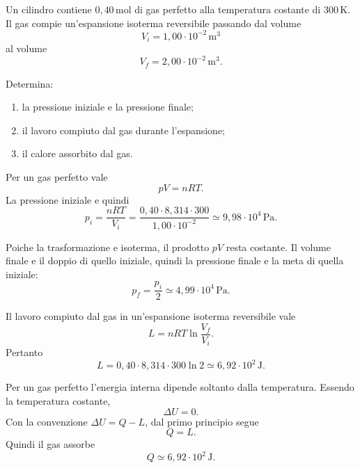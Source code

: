 
\begin{esercizio}
Un cilindro contiene \(0{,}40\,\mathrm{mol}\) di gas perfetto alla temperatura
costante di \(300\,\mathrm{K}\). Il gas compie un'espansione isoterma
reversibile passando dal volume
\[
V_i=1{,}00\cdot 10^{-2}\,\mathrm{m^3}
\]
al volume
\[
V_f=2{,}00\cdot 10^{-2}\,\mathrm{m^3}.
\]

Determina:
\begin{enumerate}
  \item la pressione iniziale e la pressione finale;
  \item il lavoro compiuto dal gas durante l'espansione;
  \item il calore assorbito dal gas.
\end{enumerate}
\end{esercizio}

\begin{soluzione}
Per un gas perfetto vale
\[
pV=nRT.
\]
La pressione iniziale e quindi
\[
p_i=\frac{nRT}{V_i}
=\frac{0{,}40\cdot 8{,}314\cdot 300}{1{,}00\cdot10^{-2}}
\simeq 9{,}98\cdot10^4\,\mathrm{Pa}.
\]

Poiche la trasformazione e isoterma, il prodotto \(pV\) resta costante. Il
volume finale e il doppio di quello iniziale, quindi la pressione finale e la
meta di quella iniziale:
\[
p_f=\frac{p_i}{2}
\simeq 4{,}99\cdot10^4\,\mathrm{Pa}.
\]

Il lavoro compiuto dal gas in un'espansione isoterma reversibile vale
\[
L=nRT\ln\frac{V_f}{V_i}.
\]
Pertanto
\[
L=0{,}40\cdot8{,}314\cdot300\ln 2
\simeq 6{,}92\cdot10^2\,\mathrm{J}.
\]

Per un gas perfetto l'energia interna dipende soltanto dalla temperatura. Essendo
la temperatura costante,
\[
\Delta U=0.
\]
Con la convenzione \(\Delta U=Q-L\), dal primo principio segue
\[
Q=L.
\]
Quindi il gas assorbe
\[
\boxed{Q\simeq 6{,}92\cdot10^2\,\mathrm{J}}.
\]
\end{soluzione}
